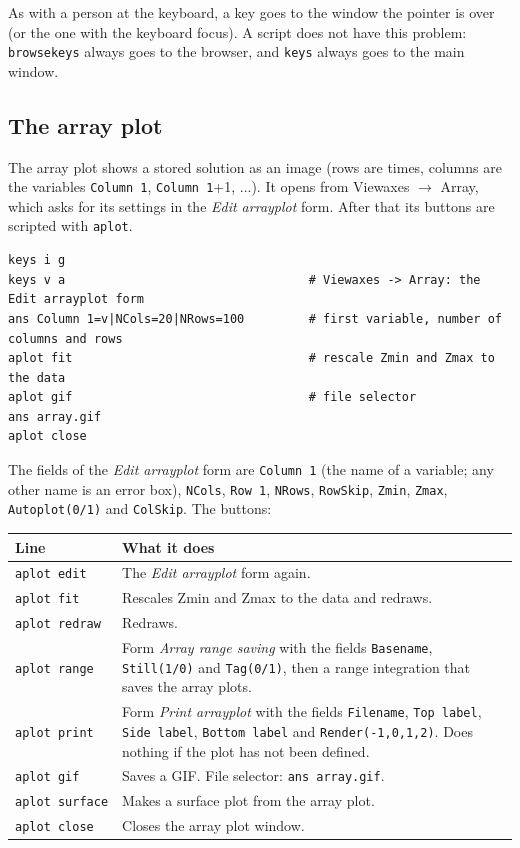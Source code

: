 \documentclass{article}
\begin{document}
As with a person at the keyboard, a key goes to the window the
pointer is over (or the one with the keyboard focus). A script does not
have this problem: \texttt{browsekeys} always goes to the browser, and
\texttt{keys} always goes to the main window.

\subsection{The array plot}\label{scr:8}

The array plot shows a stored solution as an image (rows are times,
columns are the variables \texttt{Column\ 1}, \texttt{Column\ 1}+1,
...). It opens from Viewaxes $\rightarrow$ Array, which asks for its settings in the
\emph{Edit arrayplot} form. After that its buttons are scripted with
\texttt{aplot}.

{\small\begin{verbatim}
keys i g
keys v a                                  # Viewaxes -> Array: the Edit arrayplot form
ans Column 1=v|NCols=20|NRows=100         # first variable, number of columns and rows
aplot fit                                 # rescale Zmin and Zmax to the data
aplot gif                                 # file selector
ans array.gif
aplot close
\end{verbatim}}

The fields of the \emph{Edit arrayplot} form are
\texttt{Column\ 1} (the name of a variable; any other name is an
error box), \texttt{NCols}, \texttt{Row\ 1}, \texttt{NRows},
\texttt{RowSkip}, \texttt{Zmin}, \texttt{Zmax},
\texttt{Autoplot(0/1)} and \texttt{ColSkip}. The buttons:

\begin{longtable}[]{@{}p{}p{}@{}}
\toprule\noalign{}
Line & What it does \\
\midrule\noalign{}
\endhead
\bottomrule\noalign{}
\endlastfoot
\texttt{aplot\ edit} & The \emph{Edit arrayplot} form again. \\
\texttt{aplot\ fit} & Rescales Zmin and Zmax to the data and redraws. \\
\texttt{aplot\ redraw} & Redraws. \\
\texttt{aplot\ range} & Form \emph{Array range saving} with the fields \texttt{Basename},
\texttt{Still(1/0)} and \texttt{Tag(0/1)}, then a range
integration that saves the array plots. \\
\texttt{aplot\ print} & Form \emph{Print arrayplot} with the fields \texttt{Filename},
\texttt{Top\ label}, \texttt{Side\ label}, \texttt{Bottom\ label}
and \texttt{Render(-1,0,1,2)}. Does nothing if the plot has not been
defined. \\
\texttt{aplot\ gif} & Saves a GIF. File selector: \texttt{ans\ array.gif}. \\
\texttt{aplot\ surface} & Makes a surface plot from the array plot. \\
\texttt{aplot\ close} & Closes the array plot window. \\
\end{longtable}
\end{document}
